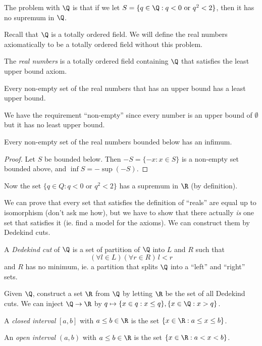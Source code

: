 \documentclass[a4paper]{article}
\begin{document}
The problem with $\Q$ is that if we let $S = \{q\in \Q: q < 0 \text{ or } q^2 < 2\}$, then it has no supremum in $\Q$.

Recall that $\Q$ is a totally ordered field. We will define the real numbers axiomatically to be a totally ordered field without this problem.
\begin{defi}
  The \emph{real numbers} is a totally ordered field containing $\Q$ that satisfies the least upper bound axiom.
\end{defi}

\begin{axiom}
  Every non-empty set of the real numbers that has an upper bound has a least upper bound.
\end{axiom}

We have the requirement ``non-empty'' since every number is an upper bound of $\emptyset$ but it has no least upper bound.

\begin{cor}
  Every non-empty set of the real numbers bounded below has an infimum.
\end{cor}
\begin{proof}
  Let $S$ be bounded below. Then $-S = \{-x: x\in S\}$ is a non-empty set bounded above, and $\inf S = -\sup (-S)$.
\end{proof}
Now the set $\{q\in Q: q < 0 \text{ or } q^2 < 2\}$ has a supremum in $\R$ (by definition).

We can prove that every set that satisfies the definition of ``reals'' are equal up to isomorphism (don't ask me how), but we have to show that there actually \emph{is} one set that satisfies it (ie. find a model for the axioms). We can construct them by Dedekind cuts.

\begin{defi}
  A \emph{Dedekind cut} of $\Q$ is a set of partition of $\Q$ into $L$ and $R$ such that
  \[
    (\forall l\in L)(\forall r\in R)\,l < r
  \]
  and $R$ has no minimum, ie. a partition that splits $\Q$ into a ``left'' and ``right'' sets.
\end{defi}

Given $\Q$, construct a set $\R$ from $\Q$ by letting $\R$ be the set of all Dedekind cuts. We can inject $\Q\to \R$ by $q\mapsto \{x\in q: x \leq q\}, \{x\in \Q: x> q\}$.

\begin{defi}
  A \emph{closed interval} $[a, b]$ with $a \leq b\in \R$ is the set $\{x\in \R: a\leq x\leq b\}$.

  An \emph{open interval} $(a, b)$ with $a \leq b\in \R$ is the set $\{x\in \R: a< x< b\}$.
\end{defi}
\end{document}
